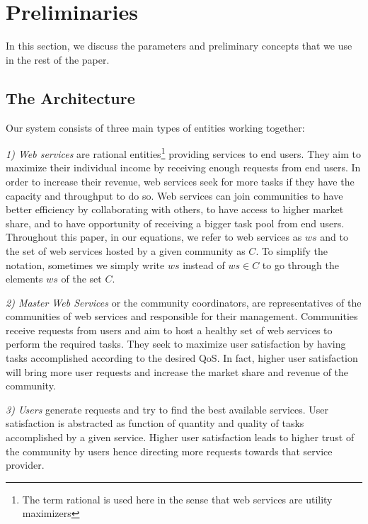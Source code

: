 \documentclass[10pt,journal,cspaper,compsoc]{IEEEtran}
\begin{document}



\section{Preliminaries}\label{s:preliminaries}

In this section, we discuss the parameters and preliminary
concepts that we use in the rest of the paper.

\subsection{The Architecture}

Our system consists of three main types of entities working
together:

\emph{1) Web services} are rational entities\footnote{The term
rational is used here in the sense that web services are utility
maximizers} providing services to end users. They aim to maximize
their individual income by receiving enough requests from end
users. In order to increase their revenue, web services seek for
more tasks if they have the capacity and throughput to do so. Web
services can join communities to have better efficiency by
collaborating with others, to have access to higher market share,
and to have opportunity of receiving a bigger task pool from end
users. Throughout this paper, in
our equations, we refer to web services as $ws$ and to the set of
web services hosted by a given community as $C$. To simplify the
notation, sometimes we simply write $ws$ instead of $ws \in C$ to
go through the elements $ws$ of the set $C$.

\emph{2) Master Web Services} or the community coordinators, are representatives of the
communities of web services and responsible for their management.
Communities receive requests from users and aim to host a healthy
set of web services to perform the required tasks. They seek to
maximize user satisfaction by having tasks accomplished according
to the desired QoS. In fact, higher user satisfaction will bring
more user requests and increase the market share and revenue of
the community.

\emph{3) Users} generate requests and try to find the best
available services. User satisfaction is abstracted as function of
quantity and quality of tasks accomplished by a given service.
Higher user satisfaction leads to higher trust of the community by users hence directing more requests towards that service provider.
\end{document}

